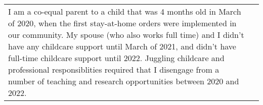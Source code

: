 \begin{longtable}{@{}>{\raggedright}p{5.25in} @{} >{\raggedleft}X@{}}

I am a co-equal parent to a child that was 4 months old in March of 2020, when the first stay-at-home orders were implemented in our community.
My spouse (who also works full time) and I didn't have any childcare support until March of 2021, and didn't have full-time childcare support until 2022.
Juggling childcare and professional responsiblities required that I disengage from a number of teaching and research opportunities between 2020 and 2022.

\end{longtable}
